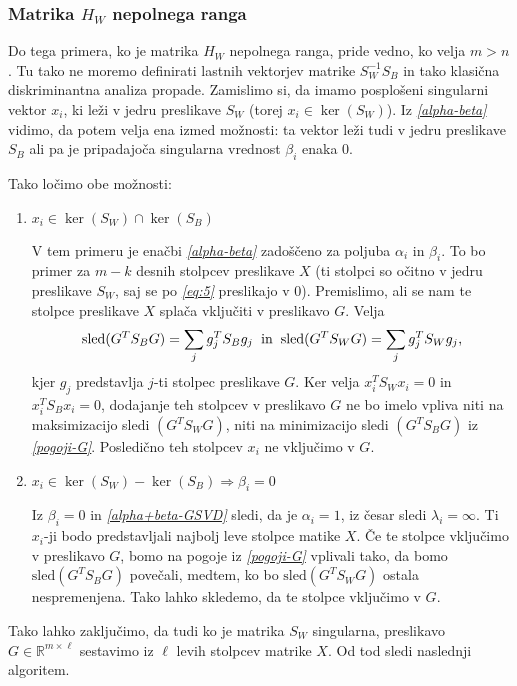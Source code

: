 \documentclass[mat1]{article}
\begin{document}

\subsubsection{Matrika $H_W$ nepolnega ranga}
Do tega primera, ko je matrika $H_W$ nepolnega ranga, pride vedno, ko velja $m>n$. Tu tako ne moremo definirati lastnih vektorjev matrike $S_W^{-1} S_B$ in tako klasična diskriminantna analiza propade. Zamislimo si, da imamo posplošeni singularni vektor $x_i$, ki leži v jedru preslikave $S_W$ (torej $x_i \in \ker (S_W)$).  Iz \textit{\eqref{alpha-beta}} vidimo, da potem velja ena izmed možnosti: ta vektor leži tudi v jedru preslikave $S_B$ ali pa je pripadajoča singularna vrednost $\beta_i$ enaka 0.

Tako ločimo obe možnosti:
\begin{enumerate}
\item{$x_i \in \ker (S_W) \cap \ker (S_B)$}

V tem primeru je enačbi \textit{\eqref{alpha-beta}} zadoščeno za poljuba $\alpha_i$ in $\beta_i$. To bo primer za $m-k$ desnih stolpcev preslikave $X$ (ti stolpci so očitno v jedru preslikave $S_W$, saj se po \textit{\eqref{eq:5}} preslikajo v 0). Premislimo, ali se nam te stolpce preslikave $X$ splača vključiti v preslikavo $G$. Velja
$$
\text{sled}(G^T S_B G) = \sum_j g_j^T S_B g_j
\hspace{2mm}
\text{in}
\hspace{2mm}
\text{sled}(G^T S_W G) = \sum_j g_j^T S_W g_j
\text{,}
$$
kjer $g_j$ predstavlja $j$-ti stolpec preslikave $G$. Ker velja $x_i^T S_W x_i = 0$ in $x_i^T S_B x_i = 0$, dodajanje teh stolpcev v preslikavo $G$ ne bo imelo vpliva niti na maksimizacijo sledi $\left( G^T S_W G \right)$, niti na minimizacijo sledi $\left( G^T S_B G \right)$ iz \textit{\eqref{pogoji-G}}. Posledično teh stolpcev $x_i$ ne vključimo v $G$.

\item{$x_i \in \ker (S_W) - \ker (S_B) 	\Rightarrow \beta_i = 0$}

Iz $\beta_i = 0$ in \textit{\eqref{alpha+beta-GSVD}} sledi, da je $\alpha_i = 1$, iz česar sledi $\lambda_i = \infty$. Ti $x_i$-ji bodo predstavljali najbolj leve stolpce matike $X$. Če te stolpce vključimo v preslikavo $G$, bomo na pogoje iz \textit{\eqref{pogoji-G}} vplivali tako, da bomo $\text{sled}(G^T S_B G)$ povečali, medtem, ko bo $\text{sled}(G^T S_W G)$ ostala nespremenjena. Tako lahko skledemo, da te stolpce vključimo v $G$.
\end{enumerate}
Tako lahko zaključimo, da tudi ko je matrika $S_W$ singularna, preslikavo $G \in \mathbb{R}^{m \times \ell}$ sestavimo iz $\ell$ levih stolpcev matrike $X$. Od tod sledi naslednji algoritem.
\end{document}
